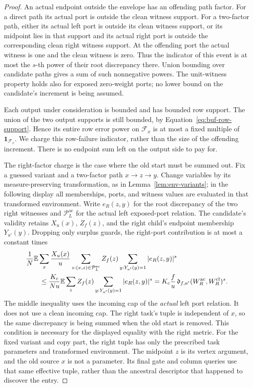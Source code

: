 \begin{proof}
An actual endpoint outside the envelope has an offending path factor.
For a direct path its actual port is outside the clean witness support.
For a two-factor path, either its actual left port is outside its clean
witness support, or its midpoint lies in that support and its actual
right port is outside the corresponding clean right witness support.
At the offending port the actual witness is one and the clean witness
is zero.  Thus the indicator of this event is at most the $s$-th power
of their root discrepancy there.  Union bounding over candidate paths
gives a sum of such nonnegative powers.  The unit-witness property holds
also for exposed zero-weight ports; no lower bound on the candidate's
increment is being assumed.

Each output under consideration is bounded and has bounded row support.
The union of the two output supports is still bounded, by
Equation~\eqref{eq:buf-row-support}.  Hence its entire row error power on
$\mathcal F_x$ is at most a fixed multiple of
$\mathbf1_{\mathcal F_x}$.  We charge this row-failure indicator, rather
than the size of the offending increment.  There is no endpoint sum left
on the output side to pay for.

The right-factor charge is the case where the old start must be summed
out.  Fix a guessed variant and a two-factor path $x\to z\to y$.
Change variables by its measure-preserving transformation, as in
Lemma~\ref{lem:env-variants}; in the following display all memberships,
ports, and witness values are evaluated in that transformed environment.
Write $e_R(z,y)$ for the root discrepancy of the two right witnesses and
$\mathcal P^{\mathrm{ac}}_L$ for the actual left exposed-port relation.
The candidate's validity retains $X_u(x)$, $Z_f(z)$, and the right
child's endpoint membership $Y_{a'}(y)$.  Dropping only surplus guards,
the right-port contribution is at most a constant times
\begin{align}
 &\frac1N\mathbb E\sum_x\frac{X_u(x)}u
       \sum_{z:(x,z)\in\mathcal P^{\mathrm{ac}}_L}Z_f(z)
       \sum_{y:Y_{a'}(y)=1}|e_R(z,y)|^s \notag\\
 &\qquad\le\frac{K_c}{N u}\mathbb E\sum_z Z_f(z)
       \sum_{y:Y_{a'}(y)=1}|e_R(z,y)|^s
   =K_c\frac f u\,\mathfrak d_{f,a'}(W_R^{\mathrm{ac}},
                                      W_R^{\mathrm{cl}})^s.
 \label{eq:fp-actual-incoming}
\end{align}
The middle inequality uses the incoming cap of the \emph{actual} left
port relation.  It does not use a clean incoming cap.  The right task's
tuple is independent of $x$, so the same discrepancy is being summed
when the old start is removed.  This condition is necessary for the
displayed equality with the right metric.
For the fixed variant and copy part, the right tuple has only the
prescribed task parameters and transformed environment.  The midpoint
$z$ is its vertex argument, and the old source $x$ is not a parameter.
Its final gate and column queries use that same effective tuple, rather
than the ancestral descriptor that happened to discover the entry.


\end{proof}

